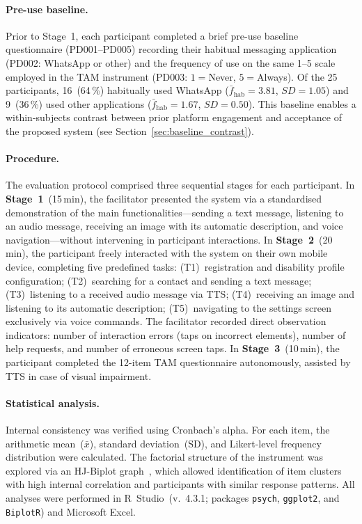 \documentclass[journal]{IEEEtran}
\begin{document}
	\paragraph{Pre-use baseline.}
	Prior to Stage~1, each participant completed a brief pre-use
	baseline questionnaire (PD001--PD005) recording their habitual
	messaging application (PD002: WhatsApp or other) and the frequency
	of use on the same 1--5 scale employed in the TAM instrument
	(PD003: $1{=}$Never, $5{=}$Always).
	Of the 25 participants, 16~(64\,\%) habitually used WhatsApp
	($\bar{f}_{\text{hab}}{=}3.81$, $SD{=}1.05$) and 9~(36\,\%)
	used other applications ($\bar{f}_{\text{hab}}{=}1.67$, $SD{=}0.50$).
	This baseline enables a within-subjects contrast between prior
	platform engagement and acceptance of the proposed system
	(see Section~\ref{sec:baseline_contrast}).
	
	\paragraph{Procedure.}
	The evaluation protocol comprised three sequential stages
	for each participant.
	In \textbf{Stage~1}~(15\,min), the facilitator presented
	the system via a standardised demonstration of the main
	functionalities---sending a text message, listening to an audio
	message, receiving an image with its automatic description,
	and voice navigation---without intervening in participant
	interactions.
	In \textbf{Stage~2}~(20\,min), the participant freely
	interacted with the system on their own mobile device,
	completing five predefined tasks: (T1)~registration and
	disability profile configuration; (T2)~searching for a contact
	and sending a text message; (T3)~listening to a received audio
	message via TTS; (T4)~receiving an image and listening to its
	automatic description; (T5)~navigating to the settings screen
	exclusively via voice commands.
	The facilitator recorded direct observation indicators:
	number of interaction errors (taps on incorrect elements),
	number of help requests, and number of erroneous screen taps.
	In \textbf{Stage~3}~(10\,min), the participant completed the
	12-item TAM questionnaire autonomously, assisted by TTS in case
	of visual impairment.
	
	\paragraph{Statistical analysis.}
	Internal consistency was verified using Cronbach's alpha.
	For each item, the arithmetic mean~($\bar{x}$), standard
	deviation~(SD), and Likert-level frequency distribution were
	calculated.
	The factorial structure of the instrument was explored via
	an HJ-Biplot graph~\cite{galindo1986,cubilla2021},
	which allowed identification of item clusters with high
	internal correlation and participants with similar response
	patterns.
	All analyses were performed in R~Studio~(v.~4.3.1;
	packages \texttt{psych}, \texttt{ggplot2}, and \texttt{BiplotR})
	and Microsoft Excel.
	
\end{document}

